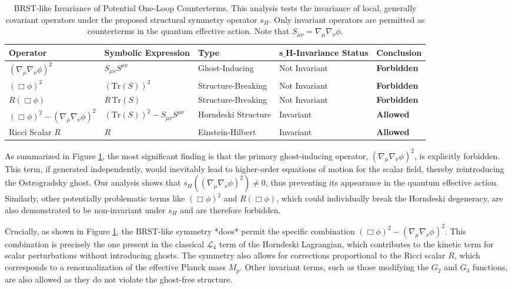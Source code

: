 \documentclass[twocolumn]{aastex631}
\begin{document}
\begin{table}[t]
\centering
\caption{BRST-like Invariance of Potential One-Loop Counterterms. This analysis tests the invariance of local, generally covariant operators under the proposed structural symmetry operator $s_H$. Only invariant operators are permitted as counterterms in the quantum effective action. Note that $S_{\mu\nu} = \nabla_\mu\nabla_\nu\phi$.}
\begin{tabular}{l l l l l}
\hline
\textbf{Operator} & \textbf{Symbolic Expression} & \textbf{Type} & \textbf{s\ensuremath{\_}H-Invariance Status} & \textbf{Conclusion} \\
\hline
$(\nabla_\mu\nabla_\nu\phi)^2$ & $S_{\mu\nu} S^{\mu\nu}$ & Ghost-Inducing & Not Invariant & \textbf{Forbidden} \\
$(\Box\phi)^2$ & $(\text{Tr}(S))^2$ & Structure-Breaking & Not Invariant & \textbf{Forbidden} \\
$R (\Box\phi)$ & $R \, \text{Tr}(S)$ & Structure-Breaking & Not Invariant & \textbf{Forbidden} \\
$(\Box\phi)^2 - (\nabla_\mu\nabla_\nu\phi)^2$ & $(\text{Tr}(S))^2 - S_{\mu\nu} S^{\mu\nu}$ & Horndeski Structure & Invariant & \textbf{Allowed} \\
Ricci Scalar $R$ & $R$ & Einstein-Hilbert & Invariant & \textbf{Allowed} \\
\hline
\end{tabular}
\label{tab:brst_invariance}
\end{table}

As summarized in Figure \ref{tab:brst_invariance}, the most significant finding is that the primary ghost-inducing operator, $(\nabla_\mu\nabla_\nu\phi)^2$, is explicitly forbidden. This term, if generated independently, would inevitably lead to higher-order equations of motion for the scalar field, thereby reintroducing the Ostrogradsky ghost. Our analysis shows that $s_H((\nabla_\mu\nabla_\nu\phi)^2) \neq 0$, thus preventing its appearance in the quantum effective action. Similarly, other potentially problematic terms like $(\Box\phi)^2$ and $R(\Box\phi)$, which could individually break the Horndeski degeneracy, are also demonstrated to be non-invariant under $s_H$ and are therefore forbidden.

Crucially, as shown in Figure \ref{tab:brst_invariance}, the BRST-like symmetry *does* permit the specific combination $(\Box\phi)^2 - (\nabla_\mu\nabla_\nu\phi)^2$. This combination is precisely the one present in the classical $\mathcal{L}_4$ term of the Horndeski Lagrangian, which contributes to the kinetic term for scalar perturbations without introducing ghosts. The symmetry also allows for corrections proportional to the Ricci scalar $R$, which corresponds to a renormalization of the effective Planck mass $M_p$. Other invariant terms, such as those modifying the $G_2$ and $G_3$ functions, are also allowed as they do not violate the ghost-free structure.
\end{document}
